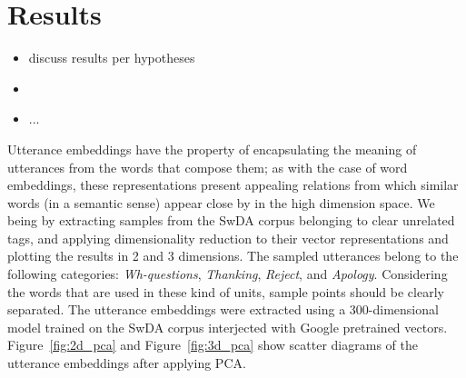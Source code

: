 \section{Results}\label{sec:results}
\begin{itemize}
	\item discuss results per hypotheses
	\item {}
	\item ...
\end{itemize}

Utterance embeddings have the property of encapsulating the meaning of utterances from the words that compose them; as with the case of word embeddings, these representations present appealing relations from which similar words (in a semantic sense) appear close by in the high dimension space. We being by extracting samples from the SwDA corpus belonging to clear unrelated tags, and applying dimensionality reduction to their vector representations and plotting the results in 2 and 3 dimensions. The sampled utterances belong to the following categories: \emph{Wh-questions}, \emph{Thanking}, \emph{Reject}, and \emph{Apology}. Considering the words that are used in these kind of units, sample points should be clearly separated. The utterance embeddings were extracted using a 300-dimensional model trained on the SwDA corpus interjected with Google pretrained vectors. Figure~\ref{fig:2d_pca} and Figure~\ref{fig:3d_pca} show scatter diagrams of the utterance embeddings after applying PCA.

